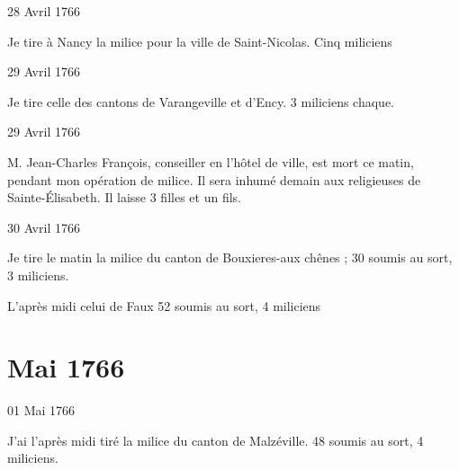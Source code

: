                      \begin{diary}{28 Avril 1766}{}

                         Je tire à Nancy
                           la milice pour la ville
                           de Saint-Nicolas. Cinq
                           miliciens \bigskip


                     \end{diary}

                     \begin{diary}{29 Avril 1766}{}

                         Je tire celle des cantons de Varangeville
                           et d'Ency. 3 miliciens
                           chaque. \bigskip


                     \end{diary}



                     \begin{diary}{29 Avril 1766}{}


                           M. Jean-Charles François, conseiller en l'hôtel de ville,
                           est mort ce matin, pendant mon opération
                           de milice. Il sera inhumé demain aux religieuses
                              de Sainte-Élisabeth. Il laisse 3 filles et un fils. \bigskip


                     \end{diary}

                     \begin{diary}{30 Avril 1766}{}

                         Je tire le matin la milice du canton de
                           Bouxieres-aux chênes ; 30
                           soumis au sort, 3 miliciens. \bigskip


                         L'après midi celui de Faux 52 soumis au
                           sort, 4 miliciens \bigskip


                     \end{diary}
                  \chapter*{Mai 1766}


                     \begin{diary}{01 Mai 1766}{}

                         J'ai l'après midi tiré la milice du canton
                           de Malzéville. 48 soumis au
                           sort, 4 miliciens. \bigskip


                     \end{diary}

